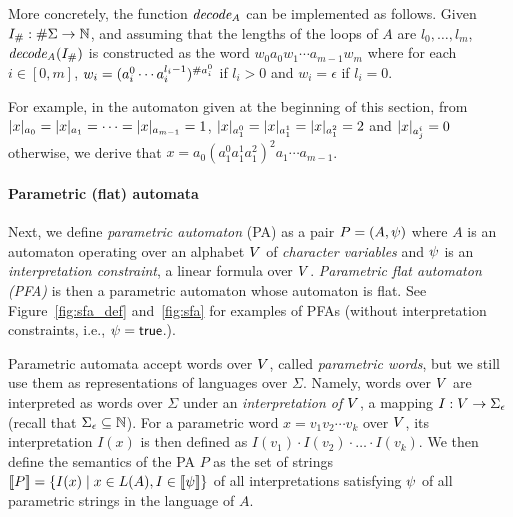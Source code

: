\documentclass[sigplan,review,anonymous]{acmart}\settopmatter{printfolios=true,printccs=false,printacmref=false}
\begin{document}
 More concretely, the function $\mathit{decode_{A}}$ can be implemented as follows. 
Given $I_{\#}:\#\Sigma\rightarrow\mathbb{N}$,
and assuming that the lengths of the loops of $A$ are $l_0,\ldots,l_{m}$, 
$\mathit{decode_{A}}(I_{\#})$ is constructed as the word $w_0 a_{0} w_1 \cdots a_{m-1} w_{m}$ where for each $i\in [0,m]$,
$w_i = (a_i^0 \cdots a_i^{l_{i}-1})^{\#{a_i^0}}$ if $l_i >0$ and $w_i = \epsilon$ if $l_i = 0$. 

For example, in the automaton given at the beginning of this section, 
from $|x|_{a_0} = |x|_{a_1} = \cdots = |x|_{a_{m-1}}=1$, $|x|_{a^0_1}=|x|_{a^1_1}=|x|_{a^2_1}=2$ and $|x|_{a^i_j}=0$ otherwise,  we derive that $x=a_0(a^0_1a^1_1a^2_1)^2a_1\cdots a_{m-1}$. 

\paragraph{Parametric (flat) automata}
Next, we define \emph{parametric automaton} (PA) as a pair  $P = (A,\psi)$ where 
$A$ is an automaton operating over an alphabet $V$ of \emph{character variables}  
and $\psi$ is an \emph{interpretation constraint}, a linear formula over $V$. 
\emph{Parametric flat automaton (PFA)} is then a parametric automaton whose  automaton is flat. See Figure~\ref{fig:sfa_def} and~\ref{fig:sfa} for examples of PFAs (without interpretation constraints, i.e., $\psi = \mbox{$\mathsf{true}$}$.).

Parametric automata accept words over $V$, called \emph{parametric words}, but we still use them as representations of languages over $\Sigma$. 
%
Namely, words over $V$ are interpreted as words over $\Sigma$ under an
\emph{interpretation of $V$},
%
a mapping $I:V\rightarrow\Sigma_\epsilon$ (recall that $\Sigma_\epsilon \subseteq \mathbb{N}$). 
For a parametric word $x= v_1v_2\cdots v_k$ over $V$, its interpretation $I(x)$ is then defined as $I(v_1)\cdot I(v_2)\cdot \ldots \cdot I(v_k)$.
%
We then define the semantics of the PA $P$ as the set of strings   
$[\![P]\!] = \{I(x) \mid x\in L(A),I\in[\![\psi]\!]\}$ of all interpretations satisfying $\psi$ of all parametric strings in the language of $A$. 
\end{document}
